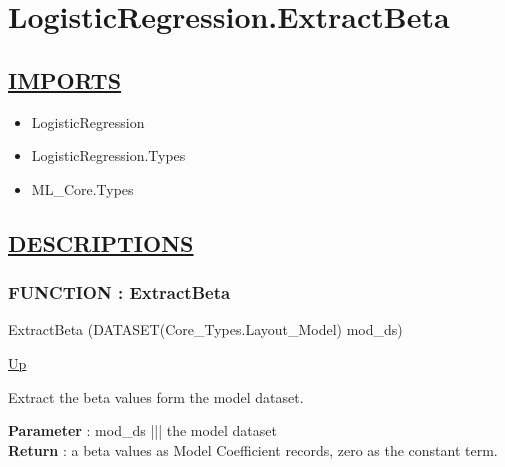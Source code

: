 \chapter*{LogisticRegression.ExtractBeta}
\hypertarget{ecldoc:toc:LogisticRegression.ExtractBeta}{}

\section*{\underline{IMPORTS}}
\begin{itemize}
\item LogisticRegression
\item LogisticRegression.Types
\item ML\_Core.Types
\end{itemize}

\section*{\underline{DESCRIPTIONS}}
\subsection*{FUNCTION : ExtractBeta}
\hypertarget{ecldoc:logisticregression.extractbeta}{}
\begin{minipage}[t]{\textwidth}
\begin{flushleft}
 ExtractBeta (DATASET(Core\_Types.Layout\_Model) mod\_ds)
\end{flushleft}
\end{minipage}
\hyperlink{ecldoc:toc:LogisticRegression}{Up}

\par
Extract the beta values form the model dataset.
\par
\textbf{Parameter} : mod\_ds ||| the model dataset \\
\textbf{Return} : a beta values as Model Coefficient records, zero as the constant term. \\
